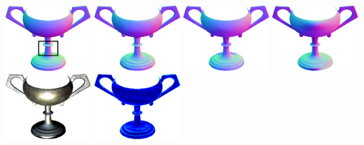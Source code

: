 \begin{minipage}{0.97\textwidth}
 \\
 \includegraphics[width=0.243\textwidth]{ch-psfcn/images/Results/DiLiGenT/GT/gobletPNGGT_normal_box.png}
 \includegraphics[width=0.243\textwidth]{ch-psfcn/images/Results/DiLiGenT/PS-FCN/gobletPNGDiLiGenT_normal.png}
 \includegraphics[width=0.243\textwidth]{ch-psfcn/images/Results/DiLiGenT/DPSN/goblet_normal.png}
 \includegraphics[width=0.243\textwidth]{ch-psfcn/images/Results/DiLiGenT/L2/gobletPNGl2_normal.png}
 \\
 \includegraphics[width=0.243\textwidth]{ch-psfcn/images/Results/DiLiGenT/GT/4.0_gobletPNG_001.png}
 \includegraphics[width=0.243\textwidth]{ch-psfcn/images/Results/DiLiGenT/PS-FCN/gobletPNGDiLiGenT_diff.png}

\end{minipage}
